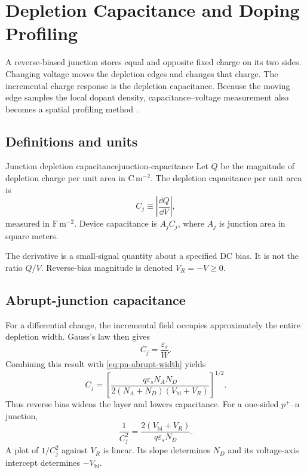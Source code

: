 \chapter{Depletion Capacitance and Doping Profiling}
\label{ch:depletion-capacitance}

A reverse-biased junction stores equal and opposite fixed charge on its two
sides.  Changing voltage moves the depletion edges and changes that charge.
The incremental charge response is the depletion capacitance.  Because the
moving edge samples the local dopant density, capacitance--voltage measurement
also becomes a spatial profiling method \cite[Chap.~3, Sec.~3.3]{szeLee2012}.

\section{Definitions and units}

\begin{definition}{Junction depletion capacitance}{junction-capacitance}
Let $Q$ be the magnitude of depletion charge per unit area in
$\mathrm{C\,m^{-2}}$.  The depletion capacitance per unit area is
\begin{equation}
  C_j\equiv\left|\frac{\dd Q}{\dd V}\right|,
  \label{eq:depletion-capacitance-definition}
\end{equation}
measured in $\mathrm{F\,m^{-2}}$.  Device capacitance is $A_jC_j$, where $A_j$
is junction area in square meters.
\end{definition}

The derivative is a small-signal quantity about a specified DC bias.  It is not
the ratio $Q/V$.  Reverse-bias magnitude is denoted $V_R=-V\ge0$.

\section{Abrupt-junction capacitance}

For a differential change, the incremental field occupies approximately the
entire depletion width.  Gauss's law then gives
\begin{equation}
  \boxed{C_j=\frac{\varepsilon_s}{W}.}
  \label{eq:depletion-capacitance-width}
\end{equation}
Combining this result with \cref{eq:pn-abrupt-width} yields
\begin{equation}
 C_j=
 \left[
 \frac{q\varepsilon_sN_AN_D}
 {2(N_A+N_D)(V_{\mathrm{bi}}+V_R)}
 \right]^{1/2}.
 \label{eq:abrupt-capacitance}
\end{equation}
Thus reverse bias widens the layer and lowers capacitance.  For a one-sided
$p^+$--n junction,
\begin{equation}
 \frac{1}{C_j^2}
 =\frac{2(V_{\mathrm{bi}}+V_R)}{q\varepsilon_sN_D}.
 \label{eq:one-sided-cv-linear}
\end{equation}
A plot of $1/C_j^2$ against $V_R$ is linear.  Its slope determines $N_D$ and
its voltage-axis intercept determines $-V_{\mathrm{bi}}$.

